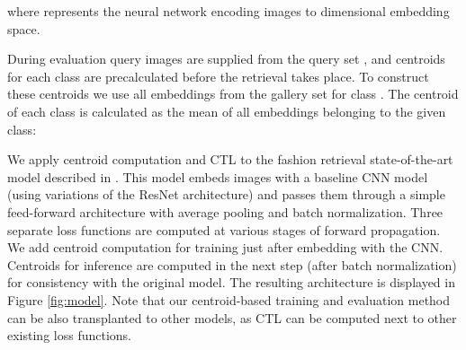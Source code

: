 \documentclass[sigconf,nonacm]{acmart}
\begin{document}
where  represents the neural network encoding images to  dimensional embedding space.

During evaluation query images are supplied from the query set , and centroids for each class  are precalculated before the retrieval takes place. To construct these centroids we use all embeddings from the gallery set  for class .
The centroid of each class  is calculated as the mean of all embeddings belonging to the given class: 



We apply centroid computation and CTL to the fashion retrieval state-of-the-art model described in \cite{Wieczorek2020}. This model embeds images with a baseline CNN model (using variations of the ResNet architecture) and passes them through a simple feed-forward architecture with average pooling and batch normalization. Three separate loss functions are computed at various stages of forward propagation. We add centroid computation for training just after embedding with the CNN. Centroids for inference are computed in the next step (after batch normalization) for consistency with the original model.  The resulting architecture is displayed in Figure \ref{fig:model}. Note that our centroid-based training and evaluation method can be also transplanted to other models, as CTL can be computed next to other existing loss functions.
\end{document}
